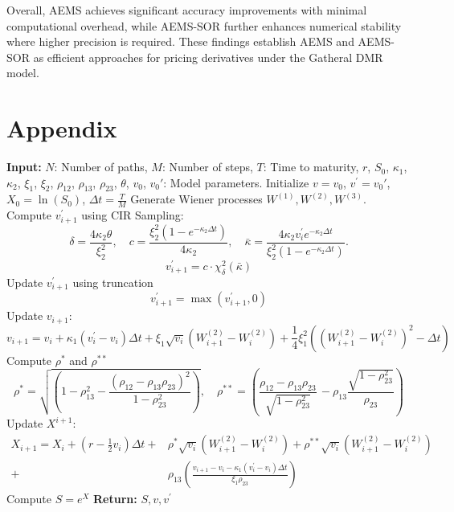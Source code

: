 \documentclass[graybox]{svmult}
\begin{document}
Overall, AEMS achieves significant accuracy improvements with minimal computational overhead, while AEMS-SOR further enhances numerical stability where higher precision is required. These findings establish AEMS and AEMS-SOR as efficient approaches for pricing derivatives under the Gatheral DMR model.







\section*{Appendix}

\begin{algorithm}[H]
\caption{AEMS Scheme for Gatheral DMR Model}
\label{alg:AEMS}
\begin{algorithmic}[1]
\State \textbf{Input:} $N$: Number of paths, $M$: Number of steps, $T$: Time to maturity, $r$, $S_0$, $\kappa_1$, $\kappa_2$, $\xi_1$, $\xi_2$, $\rho_{12}$, $\rho_{13}$, $\rho_{23}$, $\theta$, $v_0$, $v_0'$: Model parameters.
\State Initialize $v = v_0$, $v^{'} = v_0'$, $X_{0} = \ln(S_0)$, $\Delta t = \frac{T}{M}$
    \State Generate Wiener processes $W^{(1)}, W^{(2)}, W^{(3)}$. 
    \State Compute $v^{'}_{i+1}$ using CIR Sampling:
    \[
    \delta = \frac{4 \kappa_2 \theta}{\xi_2^2}, \quad c = \frac{\xi_2^2 (1 - e^{-\kappa_2 \Delta t})}{4 \kappa_2}, \quad
    \bar{\kappa} = \frac{4 \kappa_2 v^{'}_{i} e^{-\kappa_2 \Delta t}}{\xi_2^2 (1 - e^{-\kappa_2 \Delta t})}.
    \]
    \[
    v^{'}_{i+1} = c \cdot \chi^2_{\delta}(\bar{\kappa})
    \]
    \State Update $v^{'}_{i+1}$ using truncation
    \[
    v^{'}_{i+1} = \max\left(v^{'}_{i+1},0\right)
    \]
    \State Update $v_{i+1}$:
    \[
    v_{i+1} = v_{i} + \kappa_1 \left(v^{'}_{i} - v_{i}\right) \Delta t + \xi_1 \sqrt{v_{i}} \left(W^{(2)}_{i+1} - W^{(2)}_{i}\right) + \frac{1}{4} \xi_1^2 \left(\left(W^{(2)}_{i+1} - W^{(2)}_{i}\right)^2 - \Delta t\right)
    \]
    \State Compute $\rho^{*}$ and $\rho^{**}$
    \[
    \rho^*=\sqrt{\left(1-\rho^2_{13}-\frac{(\rho_{12}-\rho_{13}\rho_{23})^2}{1-\rho^2_{23}}\right)},\quad \rho^{**}=\left(\frac{\rho_{12}-\rho_{13}\rho_{23}}{\sqrt{1-\rho^2_{23}}}\,-\rho_{13}\frac{\sqrt{1-\rho_{23}^2}}{\rho_{23}}\right)
    \]
    \State Update $X^{i+1}$:
    \[
    \begin{aligned}
        X_{i+1} = X_{i} + \left(r-\frac{1}{2}v_{i}\right)\Delta t + &\rho^*  \sqrt{v_{i}}\left(W^{(2)}_{i+1}-W^{(2)}_{i}\right)+\rho^{**} \sqrt{v_{i}}\left(W^{(2)}_{i+1}-W^{(2)}_{i}\right)\\
        +&\rho_{13}\left(\frac{v_{i+1}-v_{i}-\kappa_1(v_{i}^{'}-v_{i})\Delta t}{\xi_1 \rho_{23}}\right)
    \end{aligned}
    \]
\EndFor
\State Compute $S = e^X$
\State \textbf{Return:} $S, v, v^{'}$
\end{algorithmic}
\end{algorithm}
\end{document}
